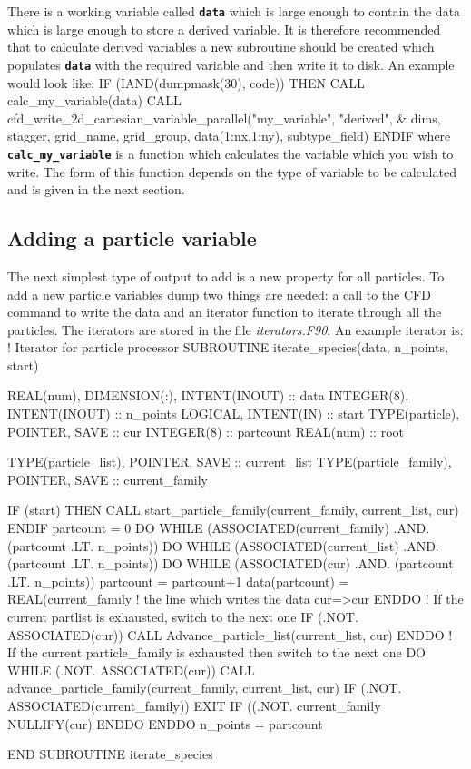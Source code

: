 \documentclass[12pt,a4paper]{article}
\newcommand{\inlinecode}[1]{{\color{warwickred} \bf\texttt{#1}}}
\newenvironment{boxverbatim}{\lboxverbatim{none}}{\endlboxverbatim}
\begin{document}
There is a working variable called \inlinecode{data} which is large enough to
contain the data which is large enough to store a derived variable. It is
therefore recommended that to calculate derived variables a new subroutine
should be created which populates \inlinecode{data} with the required variable
and then write it to disk. An example would look like:
\begin{boxverbatim}
IF (IAND(dumpmask(30), code)) THEN
  CALL calc_my_variable(data)
  CALL cfd_write_2d_cartesian_variable_parallel("my_variable", "derived", &
      dims, stagger, grid_name, grid_group, data(1:nx,1:ny), subtype_field)
ENDIF
\end{boxverbatim}
where \inlinecode{calc\_my\_variable} is a function which calculates the
variable which you wish to write. The form of this function depends on the type
of variable to be calculated and is given in the next section.


\subsection{Adding a particle variable}
The next simplest type of output to add is a new property for all particles. To
add a new particle variables dump two things are needed: a call to the CFD
command to write the data and an iterator function to iterate through all the
particles. The iterators are stored in the file {\it iterators.F90}. An example
iterator is:
\begin{boxverbatim}
! Iterator for particle processor
SUBROUTINE iterate_species(data, n_points, start)

  REAL(num), DIMENSION(:), INTENT(INOUT) :: data
  INTEGER(8), INTENT(INOUT) :: n_points
  LOGICAL, INTENT(IN) :: start
  TYPE(particle), POINTER, SAVE :: cur
  INTEGER(8) :: partcount
  REAL(num) :: root

  TYPE(particle_list), POINTER, SAVE :: current_list
  TYPE(particle_family), POINTER, SAVE :: current_family

  IF (start)  THEN
    CALL start_particle_family(current_family, current_list, cur)
  ENDIF
  partcount = 0
  DO WHILE (ASSOCIATED(current_family) .AND. (partcount .LT. n_points))
    DO WHILE (ASSOCIATED(current_list) .AND. (partcount .LT. n_points))
      DO WHILE (ASSOCIATED(cur) .AND. (partcount .LT. n_points))
        partcount = partcount+1
        data(partcount) = REAL(current_family%
           ! the line which writes the data
        cur=>cur%
      ENDDO
      ! If the current partlist is exhausted, switch to the next one
      IF (.NOT. ASSOCIATED(cur)) CALL Advance_particle_list(current_list, cur)
    ENDDO
    ! If the current particle_family is exhausted then switch to the next one
    DO WHILE (.NOT. ASSOCIATED(cur))
      CALL advance_particle_family(current_family, current_list, cur)
      IF (.NOT. ASSOCIATED(current_family)) EXIT
      IF ((.NOT. current_family%
         NULLIFY(cur)
    ENDDO
  ENDDO
  n_points = partcount

END SUBROUTINE iterate_species
\end{boxverbatim}
\end{document}
